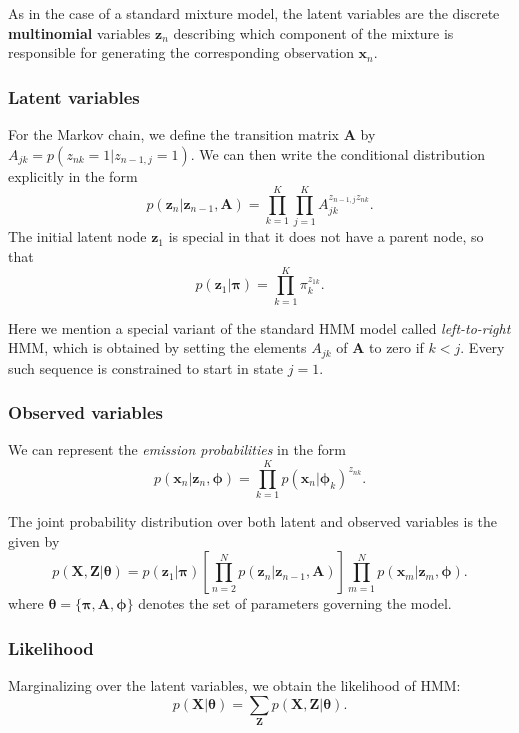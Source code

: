\documentclass[a4paper]{report}
\renewcommand{\bf}{\mathbf}
\newcommand{\imp}[1]{{\color{blue}\textit{#1}}}
\newcommand{\bs}{\boldsymbol}
\begin{document}
As in the case of a standard mixture model, the latent variables are the discrete \textbf{multinomial} variables $\bf{z}_n$ describing which component of the mixture is responsible for generating the corresponding observation $\bf{x}_n$. 

\subsubsection{Latent variables}
For the Markov chain, we define the transition matrix $\bf{A}$ by $A_{jk} = p(z_{nk}=1|z_{n-1,j}=1)$. We can then write the conditional distribution explicitly in the form
\begin{equation}
	p(\bf{z}_n|\bf{z}_{n-1},\bf{A}) = \prod_{k=1}^K \prod_{j=1}^K A_{jk}^{z_{n-1,j}z_{nk}}.
\end{equation}
The initial latent node $\bf{z}_1$ is special in that it does not have a parent node, so that
\begin{equation}
	p(\bf{z}_1|\bs{\pi}) = \prod_{k=1}^K \pi_k^{z_{1k}}.
\end{equation}

Here we mention a special variant of the standard HMM model called \imp{left-to-right} HMM, which is obtained by setting the elements $A_{jk}$ of $\bf{A}$ to zero if $k<j$. Every such sequence is constrained to start in state $j=1$.
\subsubsection{Observed variables}
We can represent the \imp{emission probabilities} in the form
\begin{equation}
	p(\bf{x}_n|\bf{z}_n,\bs{\phi}) = \prod_{k=1}^K p(\bf{x}_n|\bs{\phi}_k)^{z_{nk}}.
\end{equation}

The joint probability distribution over both latent and observed variables is the given by
\begin{equation}
	p(\bf{X,Z}|\bs{\theta}) = p(\bf{z}_1|\bs{\pi})\left[\prod_{n=2}^N p(\bf{z}_n|\bf{z}_{n-1},\bf{A})\right] \prod_{m=1}^N p(\bf{x}_m|\bf{z}_m,\bs{\phi}).
\end{equation}
where $\bs{\theta}=\{ \bs{\pi},\bf{A},\bs{\phi} \}$ denotes the set of parameters governing the model.

\subsubsection{Likelihood}
Marginalizing over the latent variables, we obtain the likelihood of HMM:
\begin{equation}
	p(\bf{X}|\bs{\theta}) = \sum_{\bf{Z}} p(\bf{X,Z}|\bs{\theta}).
\end{equation}
\end{document}
